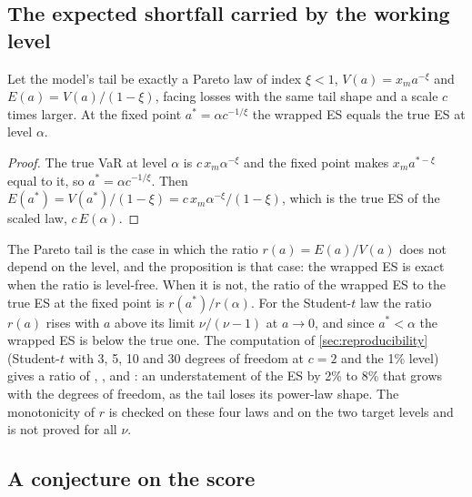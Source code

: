\subsection{The expected shortfall carried by the working level}
\label{sec:theory-es}

\begin{proposition}
\label{prop:es}
Let the model's tail be exactly a Pareto law of index $\xi < 1$, $V(a) = x_m a^{-\xi}$ and $E(a) = V(a)/(1-\xi)$, facing losses with the same tail shape and a scale $c$ times larger. At the fixed point $a^* = \alpha c^{-1/\xi}$ the wrapped ES equals the true ES at level $\alpha$.
\end{proposition}
\begin{proof}
The true VaR at level $\alpha$ is $c\,x_m\alpha^{-\xi}$ and the fixed point makes $x_m a^{*-\xi}$ equal to it, so $a^* = \alpha c^{-1/\xi}$. Then $E(a^*) = V(a^*)/(1-\xi) = c\,x_m\alpha^{-\xi}/(1-\xi)$, which is the true ES of the scaled law, $c\,E(\alpha)$.
\end{proof}

The Pareto tail is the case in which the ratio $r(a) = E(a)/V(a)$ does not depend on the level, and the proposition is that case: the wrapped ES is exact when the ratio is level-free. When it is not, the ratio of the wrapped ES to the true ES at the fixed point is $r(a^*)/r(\alpha)$. For the Student-$t$ law the ratio $r(a)$ rises with $a$ above its limit $\nu/(\nu-1)$ at $a \to 0$, and since $a^* < \alpha$ the wrapped ES is below the true one. The computation of \cref{sec:reproducibility} (Student-$t$ with 3, 5, 10 and 30 degrees of freedom at $c = 2$ and the 1\% level) gives a ratio of \thDRatioNuThree{}, \thDRatioNuFive{}, \thDRatioNuTen{} and \thDRatioNuThirty{}: an understatement of the ES by 2\% to 8\% that grows with the degrees of freedom, as the tail loses its power-law shape. The monotonicity of $r$ is checked on these four laws and on the two target levels and is not proved for all $\nu$.

\subsection{A conjecture on the score}
\label{sec:theory-conjecture}


